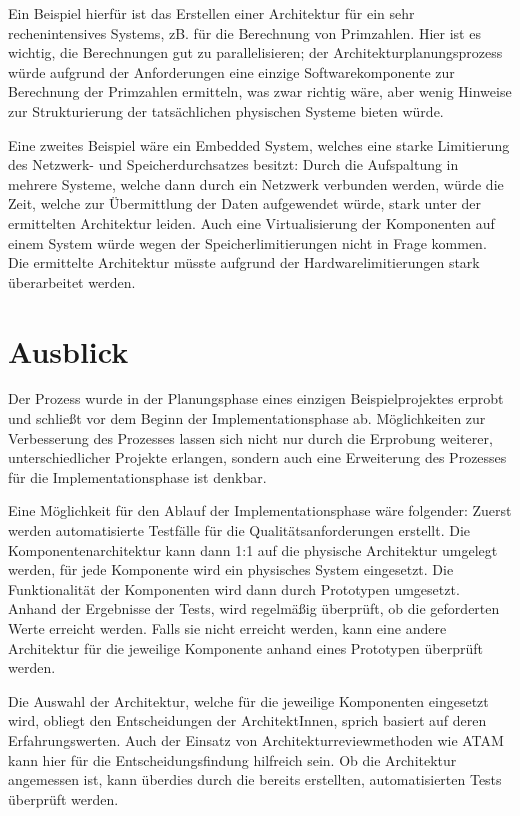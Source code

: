 Ein Beispiel hierfür ist das Erstellen einer Architektur für ein sehr rechenintensives Systems, zB. für die Berechnung von Primzahlen. Hier ist es wichtig, die Berechnungen gut zu parallelisieren; der Architekturplanungsprozess würde aufgrund der Anforderungen eine einzige Softwarekomponente zur Berechnung der Primzahlen ermitteln, was zwar richtig wäre, aber wenig Hinweise zur Strukturierung der tatsächlichen physischen Systeme bieten würde.

Eine zweites Beispiel wäre ein Embedded System, welches eine starke Limitierung des Netzwerk- und Speicherdurchsatzes besitzt: Durch die Aufspaltung in mehrere Systeme, welche dann durch ein Netzwerk verbunden werden, würde die Zeit, welche zur Übermittlung der Daten aufgewendet würde, stark unter der ermittelten Architektur leiden. Auch eine Virtualisierung der Komponenten auf einem System würde wegen der Speicherlimitierungen nicht in Frage kommen. Die ermittelte Architektur müsste aufgrund der Hardwarelimitierungen stark überarbeitet werden.

\section{Ausblick}
Der Prozess wurde in der Planungsphase eines einzigen Beispielprojektes erprobt und schließt vor dem Beginn der Implementationsphase ab. Möglichkeiten zur Verbesserung des Prozesses lassen sich nicht nur durch die Erprobung weiterer, unterschiedlicher Projekte erlangen, sondern auch eine Erweiterung des Prozesses für die Implementationsphase ist denkbar.

Eine Möglichkeit für den Ablauf der Implementationsphase wäre folgender: Zuerst werden automatisierte Testfälle für die Qualitätsanforderungen erstellt. Die Komponentenarchitektur kann dann 1:1 auf die physische Architektur umgelegt werden, für jede Komponente wird ein physisches System eingesetzt. Die Funktionalität der Komponenten wird dann durch Prototypen umgesetzt. Anhand der Ergebnisse der Tests, wird regelmäßig überprüft, ob die geforderten Werte erreicht werden. Falls sie nicht erreicht werden, kann eine andere Architektur für die jeweilige Komponente anhand eines Prototypen überprüft werden.

Die Auswahl der Architektur, welche für die jeweilige Komponenten eingesetzt wird, obliegt den Entscheidungen der ArchitektInnen, sprich basiert auf deren Erfahrungswerten. Auch der Einsatz von Architekturreviewmethoden wie ATAM kann hier für die Entscheidungsfindung hilfreich sein. Ob die Architektur angemessen ist, kann überdies durch die bereits erstellten, automatisierten Tests überprüft werden.



